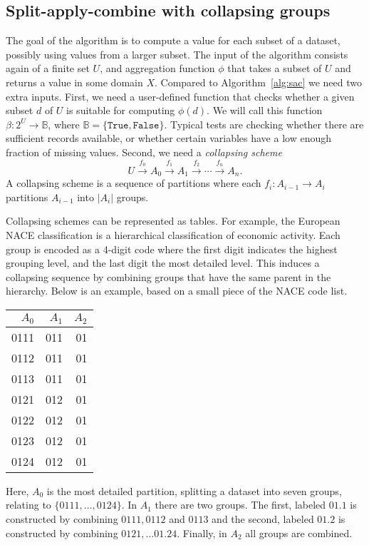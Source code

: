 \documentclass[11pt, fleqn]{article}
\begin{document}
\subsection{Split-apply-combine with collapsing groups}
The goal of the algorithm is to compute a value for each 
subset of a dataset, possibly using values from a larger
subset. The input of the algorithm consists again of a
finite set $U$, and aggregation function $\phi$ that takes
a subset of $U$ and returns a value in some domain $X$.
Compared to Algorithm~\ref{alg:sac} we need two extra
inputs. First, we need a user-defined function that checks whether
a given subset $d$ of $U$ is suitable for computing $\phi(d)$.
We will call this function $\beta: 2^U\to \mathbb{B}$, where
$\mathbb{B}=\{\texttt{True},\texttt{False}\}$. 
Typical tests are checking whether there are sufficient records
available, or whether certain variables have a low enough fraction
of missing values. Second, we need
a \emph{collapsing scheme}
\begin{equation}
U\xrightarrow{f_0}A_0\xrightarrow{f_1}A_1\xrightarrow{f_2}\cdots\xrightarrow{f_n}A_n.
\label{eq:collapsingsequence}
\end{equation}
A collapsing scheme is a sequence of partitions where each $f_i:A_{i-1}\to A_i$
partitions $A_{i-1}$ into $|A_i|$ groups. 

Collapsing schemes can be represented as tables. For example, the European NACE
classification is a hierarchical classification of economic activity. Each
group is encoded as a 4-digit code where the first digit indicates the highest
grouping level, and the last digit the most detailed level. This induces a
collapsing sequence by combining groups that have the same parent in the
hierarchy. Below is an example, based on a small piece of the NACE code list.
%
\begin{center}
\begin{tabular}{rrr}
\hline
 $A_0$& $A_1$ & $A_2$\\
\hline
0111&   011 & 01\\
0112&   011 & 01\\
0113&   011 & 01\\
0121&   012 & 01\\
0122&   012 & 01\\
0123&   012 & 01\\
0124&   012 & 01\\
\hline
\end{tabular}
\end{center}
Here, $A_0$ is the most detailed partition, splitting a dataset into seven
groups, relating to $\{0111,\ldots,0124\}$. In $A_1$ there are two groups.
The first, labeled $01.1$ is constructed by combining $0111, 0112$ and
$0113$ and the second, labeled $01.2$ is constructed by combining
$0121,\ldots 01.24$. Finally, in $A_2$ all groups are combined.
\end{document}

